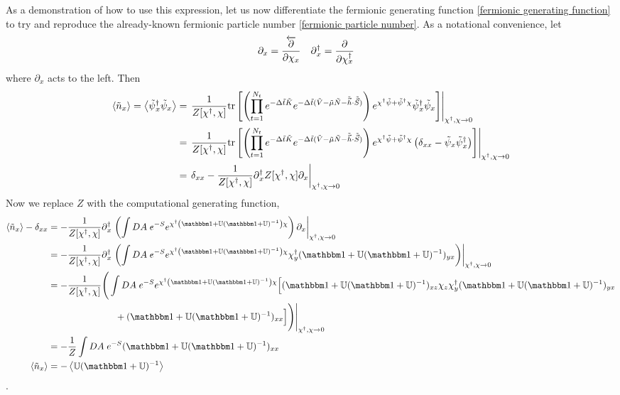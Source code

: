 As a demonstration of how to use this expression, let us now differentiate the fermionic generating function \eqref{fermionic generating function} to try and reproduce the already-known fermionic particle number \eqref{fermionic particle number}.
As a notational convenience, let
\begin{align}
	\partial_x &= \frac{\overleftarrow{\partial}}{\partial \chi_x}
	&
	\partial{}^{\dagger}_x &= \frac{\partial}{\partial \chi{}^{\dagger}_x}
\end{align}
where $\partial_x$ acts to the left.
Then
\begin{align}
	\left\langle \tilde{n}_x \right\rangle
	=
	\left\langle \tilde{\psi}{}^{\dagger}_x \tilde{\psi}_x \right\rangle
	&=
	\left.\frac{1}{Z[\chi{}^{\dagger}, \chi]} \text{tr}\left[
		\left(
		\prod_{t=1}^{N_t}
		e^{-\Delta \tilde{t}\tilde{K}}
		e^{-\Delta \tilde{t} (\tilde{V} - \tilde{\mu} \tilde{N} - \tilde{\vec{h}}\cdot \tilde{\vec{S}})}
		\right)
		e^{\chi{}^{\dagger} \tilde{\psi} + \tilde{\psi}{}^{\dagger} \chi}
		\tilde{\psi}{}^{\dagger}_x \tilde{\psi}_x
	\right]\right|_{\chi{}^{\dagger}, \chi\rightarrow 0}
	\nonumber\\
	&=
	\left.\frac{1}{Z[\chi{}^{\dagger}, \chi]} \text{tr}\left[
		\left(
		\prod_{t=1}^{N_t}
		e^{-\Delta \tilde{t}\tilde{K}}
		e^{-\Delta \tilde{t} (\tilde{V} - \tilde{\mu} \tilde{N} - \tilde{\vec{h}}\cdot \tilde{\vec{S}})}
		\right)
		e^{\chi{}^{\dagger} \tilde{\psi} + \tilde{\psi}{}^{\dagger} \chi}
		\left(\delta_{xx} - \tilde{\psi}_x \tilde{\psi}{}^{\dagger}_x\right)
	\right]\right|_{\chi{}^{\dagger}, \chi\rightarrow 0}
	\nonumber\\
	&=
	\left. \delta_{xx} - \frac{1}{Z[\chi{}^{\dagger}, \chi]} \partial{}^{\dagger}_x Z[\chi{}^{\dagger}, \chi]\partial_x \right|_{\chi{}^{\dagger}, \chi\rightarrow0}
\end{align}
Now we replace $Z$ with the computational generating function,
\begin{align}
	\expectation{\tilde{n}_x} - \delta_{xx}
	&=
	- \oneover{Z[\chi\adjoint, \chi]} \partial\adjoint_x \left. \left(
		\int DA\; e^{-S } e^{ \chi\adjoint \left(\one + \UU (\one+\UU)\inverse\right)\chi }
	\right) \partial_x \right|_{\chi\adjoint, \chi\goesto0}
	\nonumber\\
	&=
	- \oneover{Z[\chi\adjoint, \chi]} \partial\adjoint_x \left.\left(
		\int DA\; e^{-S } e^{ \chi\adjoint \left(\one + \UU (\one+\UU)\inverse\right)\chi }
		\chi\adjoint_y (\one + \UU (\one+\UU)\inverse)_{yx}
	\right) \right|_{\chi\adjoint, \chi\goesto0}
	\nonumber\\
	&=
	- \oneover{Z[\chi\adjoint, \chi]} \Bigg(
		\int DA\; e^{-S } e^{ \chi\adjoint \left(\one + \UU (\one+\UU)\inverse\right)\chi }
		\Big[
			(\one + \UU(\one+\UU)\inverse)_{xz} \chi_z \chi\adjoint_y (\one + \UU (\one+\UU)\inverse)_{yx}
			\nonumber\\
			&\hspace{1in}
			+ (\one + \UU (\one+\UU)\inverse)_{xx}
		\Big]
	\Bigg) \Bigg|_{\chi\adjoint, \chi\goesto0}
	\nonumber\\
	&=
	- \oneover{Z} \int DA\; e^{-S }
		(\one + \UU (\one+\UU)\inverse)_{xx}
	\nonumber\\
	\expectation{\tilde{n}_x} &= -\expectation{ \UU (\one+\UU)\inverse}
\end{align}
.


